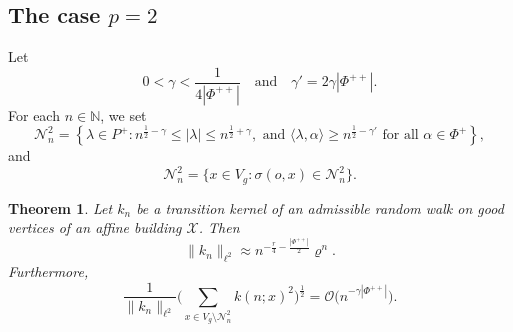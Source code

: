 \documentclass[11pt]{amsart}
\newcommand{\NN}{\mathbb{N}}
\newcommand{\calO}{\mathcal{O}}
\newcommand{\calN}{\mathcal{N}}
\newcommand{\scrX}{\mathscr{X}}
\newcommand{\scrN}{\mathscr{N}}
\newcommand{\sprod}[2]{\langle {#1}, {#2} \rangle}
\theoremstyle{plain}
\newcounter{thm}
\newtheorem{theorem}{Theorem}[section]
\theoremstyle{definition}
\numberwithin{equation}{section}
\begin{document}
\subsection{The case $p = 2$}
\label{sec:2.2}
Let
\begin{equation}
	\label{eq:38}
	0 < \gamma < \frac{1}{4|\Phi^{++}|}
	\quad\text{and}\quad
	\gamma' = 2 \gamma |\Phi^{++}|.
\end{equation} 
For each $n \in \NN$, we set
\[
	\calN_n^2 =
	\left\{\lambda \in P^+ : 
	n^{\frac{1}{2}-\gamma} \leqslant | \lambda | \leqslant n^{\frac{1}{2}+\gamma}, \text{ and }
	\sprod{\lambda}{\alpha} \geqslant n^{\frac{1}{2} - \gamma'}
	\text{ for all } \alpha\in \Phi^{+}\right\},
\]
and
\begin{equation}
	\label{eq:4b}
	\scrN_n^2 = \big\{ x \in V_g : \sigma(o, x) \in \calN_n^2 \big\}.
\end{equation}
\begin{theorem}
	\label{thm:2}
	Let $k_n$ be a transition kernel of an admissible random walk on good vertices of an affine building $\scrX$.
	Then
	\[
		\|k_n \|_{\ell^2}
		\approx 
		n^{-\frac{r}{4}-\frac{|\Phi^{++}|}{2}} \varrho^{n}.
	\]
	Furthermore,
	\[
		\frac{1}{\| k_n\|_{\ell^2}}
		\bigg( \sum_{x \in V_g \setminus \scrN_n^2} k(n; x)^2 \bigg)^\frac{1}{2} = 
		\calO\Big(n^{-\gamma|\Phi^{++}|}\Big).
	\]
\end{theorem}
\end{document}
